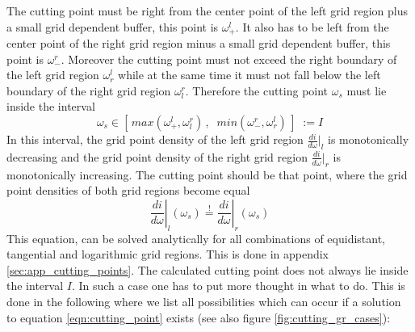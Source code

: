 The cutting point must be right from the center point of the left grid region plus a small grid dependent buffer, this point is $\omega_+^l$. It also has to be left from the center point of the right grid region minus a small grid dependent buffer, this point is $\omega_-^r$. Moreover the cutting point must not exceed the right boundary of the left grid region $\omega_r^l$ while at the same time it must not fall below the left boundary of the right grid region $\omega_l^r$. Therefore the cutting point $\omega_s$ must lie inside the interval
\begin{equation}\label{eqn:cutting_point_boundaries}
	\omega_s \in [\,max(\omega_+^l, \omega_l^r)\,,\;\; min(\omega_-^r, \omega_r^l)\,]\;:=I
\end{equation}
In this interval, the grid point density of the left grid region $\frac{di}{d\omega}|_l$ is monotonically decreasing and the grid point density of the right grid region $\frac{di}{d\omega}|_r$ is monotonically increasing. The cutting point should be that point, where the grid point densities of both grid regions become equal
\begin{equation}\label{eqn:cutting_point}
	\left. \frac{di}{d\omega}\right|_l(\omega_s) \stackrel{!}{=} \left. \frac{di}{d\omega}\right|_r(\omega_s)
\end{equation}
This equation, can be solved analytically for all combinations of equidistant, tangential and logarithmic grid regions. This is done in appendix \ref{sec:app_cutting_points}. The calculated cutting point does not always lie inside the interval $I$. In such a case one has to put more thought in what to do. This is done in the following where we list all possibilities which can occur if a solution to equation \ref{eqn:cutting_point} exists (see also figure \ref{fig:cutting_gr_cases}):

